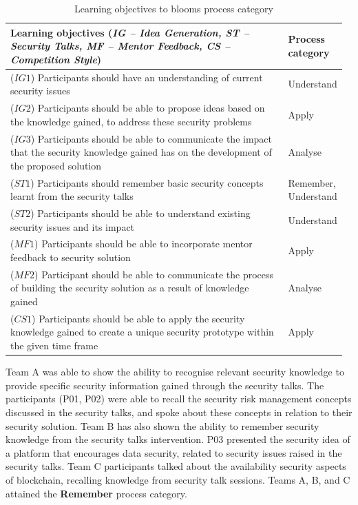\documentclass[runningheads]{llncs}
\begin{document}
 \begin{table}[h]
    \centering
    \caption{Learning objectives to blooms process category}
    \label{tab:learningoutcomesbloom}
    \begin{tabular}{|p{0.83\linewidth}|p{0.14\linewidth}|} \hline
    Learning objectives (\textit{IG -- Idea Generation, ST -- Security Talks, MF -- Mentor Feedback, CS -- Competition Style}) & Process \newline category\\ \hline
    ($IG1$) Participants should have an understanding of current security issues & Understand \\ \hline
    ($IG2$) Participants should be able to propose ideas based on the knowledge gained, to address these security problems & Apply\\ \hline
    ($IG3$) Participants should be able to communicate the impact that the security knowledge gained has on the development of the proposed solution & Analyse \\ \hline
    ($ST1$) Participants should remember basic security concepts learnt from the security talks & Remember, \newline Understand \\ \hline
    ($ST2$) Participants should be able to understand existing security issues and its impact & Understand \\ \hline
    ($MF1$) Participants should be able to incorporate mentor feedback to security solution & Apply \\ \hline
    ($MF2$) Participant should be able to communicate the process of building the security solution as a result of knowledge gained & Analyse \\ \hline
    ($CS1$) Participants should be able to apply the security knowledge gained to create a unique security prototype within the given time frame & Apply \\ \hline
    \end{tabular}
    \vspace{-10pt}
\end{table}

Team A was able to show the ability to recognise relevant security knowledge to provide specific security information gained through the security talks. The participants (P01, P02) were able to recall the security risk management concepts discussed in the security talks, and spoke about these concepts in relation to their security solution. 
Team B has also shown the ability to remember security knowledge from the security talks intervention. P03 presented the security idea of a platform that encourages data security, related to security issues raised in the security talks. Team C participants talked about the availability security aspects of blockchain, recalling knowledge from security talk sessions. Teams A, B, and C attained the \textbf{Remember} process category.
\end{document}
